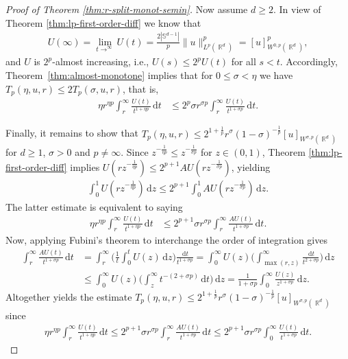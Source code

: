 \documentclass[12pt, reqno]{amsart}%
\theoremstyle{plain}  %
\theoremstyle{definition}  %
\theoremstyle{remark}
\numberwithin{equation}{section}
\DeclareMathOperator{\R}{\mathbb{R}}
\renewcommand{\d}{\,\mathrm{d}}
\begin{document}
\begin{proof}[Proof of Theorem \ref{thm:r-split-monot-semin}]
Now assume $d \geq 2$. In view of Theorem \ref{thm:lp-first-order-diff} we know that
\begin{align*}
U(\infty)=\lim_{t\to^\infty} U(t)= \frac{2|\mathbb{S}^{d-1}|}{p} \|u\|^p_{L^p(\R^d)} =[u]^p_{W^{0,p}(\R^d)},
\end{align*}
and $U$ is $2^p$-almost increasing, i.e., $U(s) \leq 2^p U(t)$ for all $s < t$. Accordingly, Theorem~\ref{thm:almost-monotone} implies  that for $0\leq \sigma<\eta $ we have $T_p(\eta, u,r) \leq 2 T_p(\sigma, u,r)$, that is,
\begin{align*}
\eta r^{\eta p}\int_r^\infty \frac{U(t)}{t^{1+\eta p}}\d t
&\leq 2^p\sigma r^{ \sigma p}\int_r^\infty \frac{U(t)}{t^{ 1+\sigma p}} \d t.
\end{align*}

Finally, it remains to show that  $T_p(\eta, u,r) \leq 2^{1+\frac{1}{p}}  r^\sigma(1-\sigma)^{-\frac{1}{p}}
[u]_{W^{\sigma,p}(\R^d)}$ for $d\geq1$,  $\sigma>0$ and $p\neq \infty$.  Since $z^{-\frac{1}{\eta p}} \leq z^{-\frac{1}{\sigma p}}$ for $z\in (0,1)$, Theorem \ref{thm:lp-first-order-diff} implies  $U(rz^{-\frac{1}{\eta p}})\leq 2^{p+1}AU(rz^{-\frac{1}{\sigma p}})$, yielding
\begin{align*}
\int_0^1 U(rz^{-\frac{1}{\eta p}}) \d z \leq 2^{p+1} \int_0^1 AU(rz^{-\frac{1}{\sigma p}})\d z .
\end{align*}
The latter estimate  is equivalent to saying
\begin{align*}
\eta r^{\eta p}\int_r^\infty \frac{U(t)}{t^{1+\eta p}}\d t
&\leq 2^{p+1}\sigma r^{\sigma p}\int_r^\infty \frac{AU(t)}{t^{ 1+\sigma p}} \d t.
\end{align*}
Now, applying Fubini's theorem to interchange the order of integration gives
\begin{align*}
 \int_r^\infty \frac{AU(t)}{t^{1+\sigma p}}\d t
&=
 \int_r^\infty
\Big(\frac{1}{t}\int_0^t U(z)\d z\Big)
\frac{\d t}{ t^{1+\sigma p}}=
 \int_0^\infty U(z) \Big( \int_{\max(r,z)}^\infty \frac{\d t}{
t^{2+\sigma p}}\Big)
\d z\\
&\leq   \int_0^\infty
U(z) \Big(\int_{z}^\infty t^{-(2+\sigma p)}\d t\Big)
\d z = \frac{1}{1+\sigma p}  \int_0^\infty
\frac{U(z)}{z^{1+\sigma p}} \d z.
\end{align*}
Altogether  yields the estimate $T_p(\eta, u,r) \leq 2^{1+\frac{1}{p}}  r^\sigma(1-\sigma)^{-\frac{1}{p}}
[u]_{W^{\sigma,p}(\R^d)}$ since 
\begin{align*}
\eta r^{\eta p}\int_r^\infty \frac{U(t)}{t^{1+\eta p}}\d t \leq2^{p+1} \sigma r^{\sigma p}  \int_r^\infty \frac{AU(t)}{t^{1+\sigma p}}\d t\leq
2^{p+1} \sigma r^{\sigma p} \int_0^\infty \frac{U(t)}{t^{1+\sigma p}}\d t.
\end{align*}
\end{proof}
 
\end{document}
